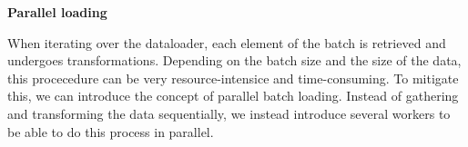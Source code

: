 \textbf{Parallel loading}

When iterating over the dataloader, each element of the batch is retrieved and undergoes transformations. Depending on the batch size and  the size of the data, this procecedure can be very resource-intensice and time-consuming. To mitigate this, we can introduce the concept of parallel batch loading. Instead of gathering and transforming the data sequentially, we instead introduce several workers to be able to do this process in parallel. 

